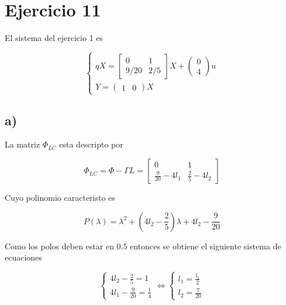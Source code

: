 \documentclass[11pt,a4paper]{article}
\newcommand{\siseq}[1]{ \left\{ \begin{array}{c}
    #1
\end{array} \right. }
\begin{document}
    \section*{Ejercicio 11}

    El sistema del ejercicio 1 es 

    \begin{equation}
        \siseq{
            qX = 
            \begin{bmatrix}
                0 & 1 \\ 
                9/20 & 2/5 
            \end{bmatrix} X +
            \begin{pmatrix}
                0 \\ 4
            \end{pmatrix} u\\ 
            Y = 
            \begin{pmatrix}
                1 & 0     
            \end{pmatrix} X
        }
    \end{equation}

    \subsection*{a)}

    La matriz $\Phi_{LC}$ esta descripto por 
    
    \begin{equation}
        \Phi_{LC} = \Phi - \Gamma L = 
        \begin{bmatrix}
            0 & 1 \\
            \frac{9}{20} - 4l_1 & \frac{2}{5} - 4l_2
        \end{bmatrix}
    \end{equation}

    Cuyo polinomio caracteristo es 

    \begin{equation}
        P(\lambda) = \lambda ^ 2 + \left( 4l_2 - \frac{2}{5} \right) \lambda + 4l_2 - \frac{9}{20}
    \end{equation}

    Como los polos deben estar en $0.5$ entonces se obtiene el siguiente sistema de ecuaciones 

    \begin{equation}
        \siseq{
            4l_2 - \frac{2}{5} = 1 \\
            4l_1 - \frac{9}{20} = \frac{1}{4}
        }
        \Leftrightarrow
        \siseq{
            l_1 = \frac{l_2}{2} \\ 
            l_2 = \frac{7}{20}
        }
    \end{equation}
\end{document}
